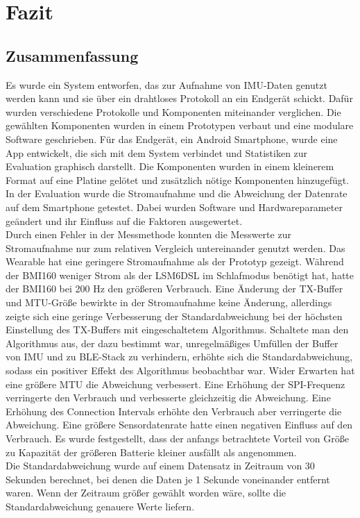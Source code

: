 \chapter{Fazit}
\label{ch:closure}

\section{Zusammenfassung}
Es wurde ein System entworfen, das zur Aufnahme von IMU-Daten genutzt werden kann und sie über ein drahtloses Protokoll an ein Endgerät schickt.
Dafür wurden verschiedene Protokolle und Komponenten miteinander verglichen.
Die gewählten Komponenten wurden in einem Prototypen verbaut und eine modulare Software geschrieben.
Für das Endgerät, ein Android Smartphone, wurde eine App entwickelt, die sich mit dem System verbindet und Statistiken zur Evaluation graphisch darstellt.
Die Komponenten wurden in einem kleinerem Format auf eine Platine gelötet und zusätzlich nötige Komponenten hinzugefügt.
In der Evaluation wurde die Stromaufnahme und die Abweichung der Datenrate auf dem Smartphone getestet.
Dabei wurden Software und Hardwareparameter geändert und ihr Einfluss auf die Faktoren ausgewertet.\\
Durch einen Fehler in der Messmethode konnten die Messwerte zur Stromaufnahme nur zum relativen Vergleich untereinander genutzt werden.
Das Wearable hat eine geringere Stromaufnahme als der Prototyp gezeigt.
Während der BMI160 weniger Strom als der LSM6DSL im Schlafmodus benötigt hat, hatte der BMI160 bei 200 Hz den größeren Verbrauch.
Eine Änderung der TX-Buffer und MTU-Größe bewirkte in der Stromaufnahme keine Änderung, allerdings zeigte sich eine geringe Verbesserung der Standardabweichung bei der höchsten Einstellung des TX-Buffers mit eingeschaltetem Algorithmus.
Schaltete man den Algorithmus aus, der dazu bestimmt war, unregelmäßiges Umfüllen der Buffer von IMU und zu BLE-Stack zu verhindern, erhöhte sich die Standardabweichung, sodass ein positiver Effekt des Algorithmus beobachtbar war.
Wider Erwarten hat eine größere MTU die Abweichung verbessert.
Eine Erhöhung der SPI-Frequenz verringerte den Verbrauch und verbesserte gleichzeitig die Abweichung.
Eine Erhöhung des Connection Intervals erhöhte den Verbrauch aber verringerte die Abweichung.
Eine größere Sensordatenrate hatte einen negativen Einfluss auf den Verbrauch.
Es wurde festgestellt, dass der anfangs betrachtete Vorteil von Größe zu Kapazität der größeren Batterie kleiner ausfällt als angenommen.\\
Die Standardabweichung wurde auf einem Datensatz in Zeitraum von 30 Sekunden berechnet, bei denen die Daten je 1 Sekunde voneinander entfernt waren.
Wenn der Zeitraum größer gewählt worden wäre, sollte die Standardabweichung genauere Werte liefern.

